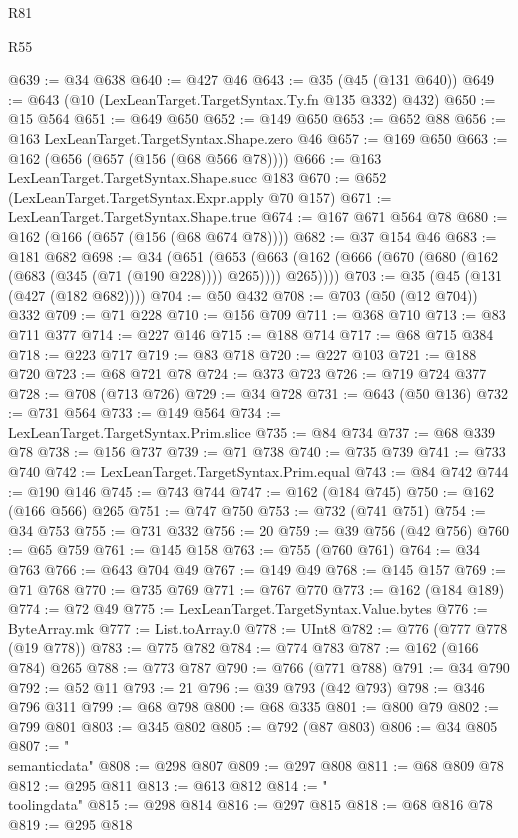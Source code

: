 \begin{lexlean}{R81}
\begin{lexlean}{R55}
\begin{coremodule}
{{{{{{{{{{{{{{{{{{{{{{{{{{{{{{{{{{{{{{{{{{{{{{{{{{{{{{{{{{{{{{@639 := @34 @638
@640 := @427 @46
@643 := @35 (@45 (@131 @640))
@649 := @643 (@10 (LexLeanTarget.TargetSyntax.Ty.fn @135 @332) @432)
@650 := @15 @564
@651 := @649 @650
@652 := @149 @650
@653 := @652 @88
@656 := @163 LexLeanTarget.TargetSyntax.Shape.zero @46
@657 := @169 @650
@663 := @162 (@656 (@657 (@156 (@68 @566 @78))))
@666 := @163 LexLeanTarget.TargetSyntax.Shape.succ @183
@670 := @652 (LexLeanTarget.TargetSyntax.Expr.apply @70 @157)
@671 := LexLeanTarget.TargetSyntax.Shape.true
@674 := @167 @671 @564 @78
@680 := @162 (@166 (@657 (@156 (@68 @674 @78))))
@682 := @37 @154 @46
@683 := @181 @682
@698 := @34
    (@651
      (@653 (@663 (@162 (@666 (@670 (@680 (@162 (@683 (@345 (@71 (@190 @228)))) @265)))) @265))))
@703 := @35 (@45 (@131 (@427 (@182 @682))))
@704 := @50 @432
@708 := @703 (@50 (@12 @704)) @332
@709 := @71 @228
@710 := @156 @709
@711 := @368 @710
@713 := @83 @711 @377
@714 := @227 @146
@715 := @188 @714
@717 := @68 @715 @384
@718 := @223 @717
@719 := @83 @718
@720 := @227 @103
@721 := @188 @720
@723 := @68 @721 @78
@724 := @373 @723
@726 := @719 @724 @377
@728 := @708 (@713 @726)
@729 := @34 @728
@731 := @643 (@50 @136)
@732 := @731 @564
@733 := @149 @564
@734 := LexLeanTarget.TargetSyntax.Prim.slice
@735 := @84 @734
@737 := @68 @339 @78
@738 := @156 @737
@739 := @71 @738
@740 := @735 @739
@741 := @733 @740
@742 := LexLeanTarget.TargetSyntax.Prim.equal
@743 := @84 @742
@744 := @190 @146
@745 := @743 @744
@747 := @162 (@184 @745)
@750 := @162 (@166 @566) @265
@751 := @747 @750
@753 := @732 (@741 @751)
@754 := @34 @753
@755 := @731 @332
@756 := 20
@759 := @39 @756 (@42 @756)
@760 := @65 @759
@761 := @145 @158
@763 := @755 (@760 @761)
@764 := @34 @763
@766 := @643 @704 @49
@767 := @149 @49
@768 := @145 @157
@769 := @71 @768
@770 := @735 @769
@771 := @767 @770
@773 := @162 (@184 @189)
@774 := @72 @49
@775 := LexLeanTarget.TargetSyntax.Value.bytes
@776 := ByteArray.mk
@777 := List.toArray.{0}
@778 := UInt8
@782 := @776 (@777 @778 (@19 @778))
@783 := @775 @782
@784 := @774 @783
@787 := @162 (@166 @784) @265
@788 := @773 @787
@790 := @766 (@771 @788)
@791 := @34 @790
@792 := @52 @11
@793 := 21
@796 := @39 @793 (@42 @793)
@798 := @346 @796 @311
@799 := @68 @798
@800 := @68 @335
@801 := @800 @79
@802 := @799 @801
@803 := @345 @802
@805 := @792 (@87 @803)
@806 := @34 @805
@807 := "\\semanticdata"
@808 := @298 @807
@809 := @297 @808
@811 := @68 @809 @78
@812 := @295 @811
@813 := @613 @812
@814 := "\\toolingdata"
@815 := @298 @814
@816 := @297 @815
@818 := @68 @816 @78
@819 := @295 @818
}}}}}}}}}}}}}}}}}}}}}}}}}}}}}}}}}}}}}}}}}}}}}}}}}}}}}}}}}}}}}}
\end{coremodule}
\end{lexlean}
\end{lexlean}
